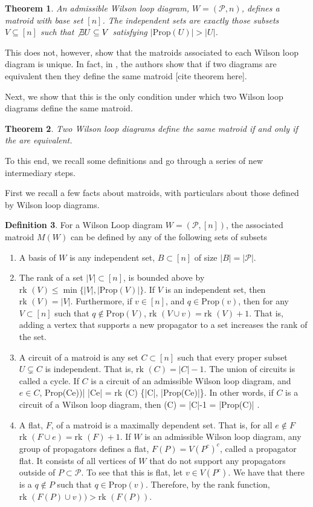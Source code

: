 \documentclass[11pt]{article}
\newcommand{\rk}{\textrm{rk }}
\def\bas #1\eas{\begin{align*} #1 \end{align*}}
\newcommand{\cP}{\mathcal{P}}
\newcommand{\Prop}{\textrm{Prop}}
\newtheorem{thm}{Theorem}[section]
\theoremstyle{remark}
\theoremstyle{definition}
\newtheorem{dfn}[thm]{Definition}
\begin{document}
\begin{thm}\cite{wilsonloop}An admissible Wilson loop diagram, $W =(\cP, n)$, defines a matroid with base set $[n]$. The independent sets are exactly those subsets $V \subseteq [n]$ such that $\not \exists U\subseteq V$ satisfying $|\Prop(U)|> |U|$. \label{thm:WLDmatroid}\end{thm}

This does not, however, show that the matroids associated to each Wilson loop diagram is unique. In fact, in \cite{wilsonloop}, the authors show that if two diagrams are equivalent then they define the same matroid [cite theorem here].

Next, we show that this is the only condition under which two Wilson loop diagrams define the same matroid.

\begin{thm}
Two Wilson loop diagrams define the same matroid if and only if the are equivalent.
\end{thm}

To this end, we recall some definitions and go through a series of new intermediary steps.

First we recall a few facts about matroids, with particulars about those defined by Wilson loop diagrams.

\begin{dfn} For a Wilson Loop diagram $W = (\cP, [n])$, the associated matroid $M(W)$ can be defined by any of the following sets of subsets
\begin{enumerate}
\item A basis of $W$ is any independent set, $B \subset [n]$ of size $|B| = |\cP|$.
\item The rank of a set $|V| \subset [n]$, is bounded above by $\rk(V) \leq \min\{ |V| , |\Prop(V)|\}$. If $V$ is an independent set, then $\rk(V) = |V|$. Furthermore, if $v \in [n]$, and $q \in \Prop(v)$, then for any $V \subset [n]$ such that $q \not \in \Prop(V)$, $\rk(V \cup v) = \rk(V) +1$. That is, adding a vertex that supports a new propagator to a set increases the rank of the set.
\item A circuit of a matroid is any set $C \subset [n]$ such that every proper subset $U \subsetneq C$ is independent. That is, $\rk(C) = |C|-1$. The union of circuits is called a cycle. If $C$ is a circuit of an admissible Wilson loop diagram, and $e \in C$, \bas |\Prop(C\setminus e))| \leq |C\setminus e| = \rk(C) \leq \min\{|C|, |\Prop(C\setminus e)|\}\;.\eas
    In other words, if $C$ is a circuit of a Wilson loop diagram, then \bas \rk(C) = |C|-1 = |\Prop(C)| \;. \eas
\item A flat, $F$, of a matroid is a maximally dependent set. That is, for all $e \not \in F$ $\rk(F \cup e) = \rk(F) +1$. If $W$ is an admissible Wilson loop diagram, any group of propagators defines a flat, $F(P) = V(P^c)^c$, called a propagator flat. It consists of all vertices of $W$ that do not support any propagators outside of $P \subset \cP$. To see that this is flat, let $v \in V(P^c)$. We have that there is a $q \not \in P$ such that $q \in \Prop(v)$. Therefore, by the rank function, $\rk( F(P) \cup v))> \rk(F(P))$.
\end{enumerate}
\end{dfn}
\end{document}

